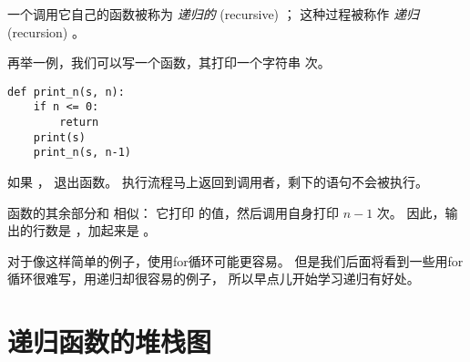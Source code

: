 {{{{%

一个调用它自己的函数被称为 {\em 递归的} (recursive) ；
这种过程被称作 {\em 递归} (recursion) 。

  
  


再举一例，我们可以写一个函数，其打印一个字符串  次。

\begin{lstlisting}
def print_n(s, n):
    if n <= 0:
        return
    print(s)
    print_n(s, n-1)
\end{lstlisting}

%

如果  ， 退出函数。
执行流程马上返回到调用者，剩下的语句不会被执行。
  


函数的其余部分和  相似： 它打印  的值，然后调用自身打印  $n-1$ 次。 因此，输出的行数是  ，加起来是 。


对于像这样简单的例子，使用for循环可能更容易。
但是我们后面将看到一些用for循环很难写，用递归却很容易的例子，
所以早点儿开始学习递归有好处。

  
  

\section{递归函数的堆栈图}
\label{recursive.stack}

}}}}

